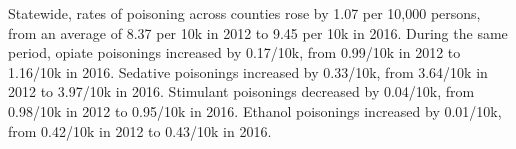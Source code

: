 \documentclass{article}
\begin{document}



Statewide, rates of poisoning across counties rose by 1.07 per 10,000 persons, from an average of 8.37 per 10k in 2012 to 9.45 per 10k in 2016.  During the same period, opiate poisonings increased by 0.17/10k, from 0.99/10k in 2012 to 1.16/10k in 2016.  Sedative poisonings increased by 0.33/10k, from 3.64/10k in 2012 to 3.97/10k in 2016.  Stimulant poisonings decreased by 0.04/10k, from 0.98/10k in 2012 to 0.95/10k in 2016.  Ethanol poisonings increased by 0.01/10k, from 0.42/10k in 2012 to 0.43/10k in 2016.  
\end{document}
